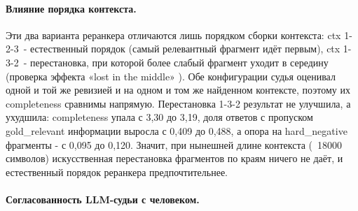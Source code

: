 \documentclass[a4paper,12pt]{article}
\begin{document}
\paragraph{Влияние порядка контекста.}

Эти два варианта реранкера отличаются лишь порядком сборки контекста: ctx 1-2-3~- естественный порядок (самый релевантный фрагмент идёт первым), ctx 1-3-2~- перестановка, при которой более слабый фрагмент уходит в середину (проверка эффекта «lost in the middle» \cite{liu2023lost}). Обе конфигурации судья оценивал одной и той же ревизией и на одном и том же найденном контексте, поэтому их completeness сравнимы напрямую. Перестановка 1-3-2 результат не улучшила, а ухудшила: completeness упала с 3,30 до 3,19, доля ответов с пропуском gold\_relevant информации выросла с 0,409 до 0,488, а опора на hard\_negative фрагменты - с 0,095 до 0,120. Значит, при нынешней длине контекста (~18000 символов) искусственная перестановка фрагментов по краям ничего не даёт, и естественный порядок реранкера предпочтительнее.

\paragraph{Согласованность LLM-судьи с человеком.}
\end{document}
